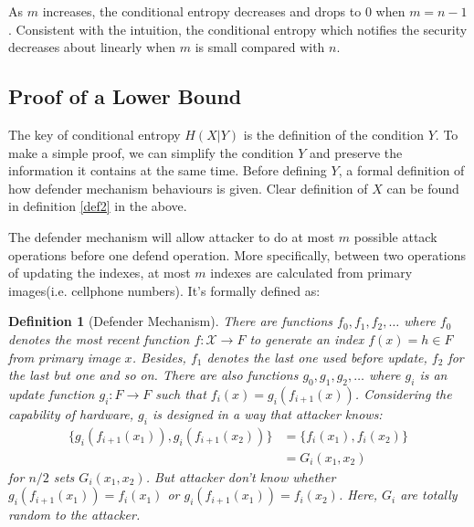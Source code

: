 \documentclass[10pt, conference, compsocconf]{IEEEtran}
\newtheorem{mydef}{Definition}
\begin{document}
		As $m$ increases, 
		the conditional entropy decreases and drops to $0$ when $m = n-1$. 
		Consistent with the intuition, the conditional
		entropy which notifies the security decreases about linearly when $m$ is small 
		compared with $n$.
		
	\subsection{Proof of a Lower Bound}
		The key
		of conditional entropy $H(X|Y)$ is the definition of the condition $Y$.
		To make a simple proof, we can simplify the
		condition $Y$ and preserve the information it contains
		at the same time. Before defining $Y$, a
		formal definition of how defender mechanism behaviours is given. Clear
		definition of $X$ can be found in definition \ref{def2} in the above.
		
		The defender mechanism will allow attacker to do at most $m$ possible
		attack operations before one defend operation. More specifically, between
		two operations of updating the indexes,
		at most $m$ indexes are calculated from primary images(i.e. cellphone numbers).
		It's formally defined as:
		\begin{mydef}[Defender Mechanism]
			There are functions $f_0, f_1, f_2, \ldots$ where
			$f_0$ denotes the most recent function $f: \mathcal{X} \rightarrow F$
			to generate an index $f(x) = h \in F$ from primary image $x$. 
			Besides, $f_1$ denotes the last one used before update, $f_2$ for the last but one and so on.
			There are also functions $g_0, g_1, g_2, \ldots$ where
			$g_i$ is an update function $g_i: F \rightarrow F$ such that
			$f_i(x) = g_i(f_{i+1}(x))$. Considering the capability of hardware,
			$g_i$ is designed in a way that attacker knows:
			\begin{align*}
				\{g_i(f_{i+1}(x_1)), g_i(f_{i+1}(x_2))\} &= \{ f_i(x_1), f_i(x_2)\}\\
					 &= G_i(x_1, x_2)
			\end{align*}
			for $n/2$ sets $G_i(x_1, x_2)$.
			But attacker don't know whether $g_i(f_{i+1}(x_1)) = f_i(x_1)$ or
			$g_i(f_{i+1}(x_1)) = f_i(x_2)$. 
			Here, $G_i$ are totally random
			to the attacker.
		\end{mydef}
		
\end{document}
